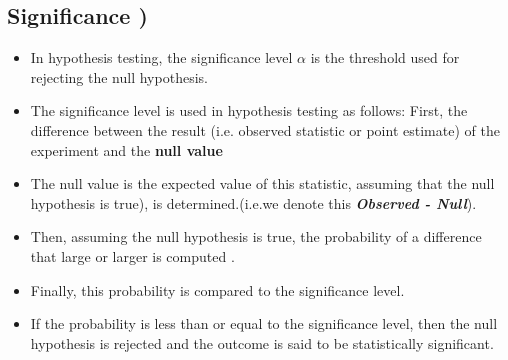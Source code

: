 \subsection*{Significance )}

\begin{itemize}
\item In hypothesis testing, the significance level $\alpha$ is the threshold used for rejecting the null hypothesis. \item The significance level is used in hypothesis testing as follows: First, the difference between the result (i.e. observed statistic or point estimate)  of the experiment and the \textbf{null value} \item The null value is the expected value of this statistic, assuming that the null hypothesis is true), is determined.(i.e.we denote this  \textbf{\textit{Observed - Null}}). \item Then, assuming the null hypothesis is true, the probability of a difference that large or larger is computed . \item Finally, this probability is compared to the significance level.\item  If the probability is less than or equal to the significance level, then the null hypothesis is rejected and the outcome is said to be statistically significant.
\end{itemize}

\newpage
